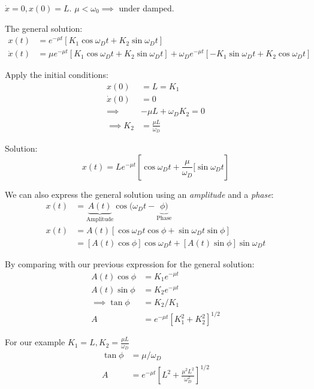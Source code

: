 \documentclass[twoside]{scrartcl}
\begin{document}
\begin{example}

$\dot{x} = 0, x(0) = L$. $\mu < \omega_0 \implies$ under damped.

The general solution:
\[
\begin{aligned}
  x(t) &= e^{-\mu t}[K_1\cos\omega_Dt + K_2\sin\omega_Dt]\\
  \dot{x}(t) &= \mu e^{-\mu t}[K_1\cos\omega_Dt + K_2\sin\omega_Dt] + \omega_De^{-\mu t}[-K_1\sin\omega_Dt + K_2\cos\omega_Dt]
\end{aligned}
\]

Apply the initial conditions:
\[
\begin{aligned}
  x(0) &= L = K_1\\
  \dot{x}(0) &= 0\\
  \implies &-\mu L  + \omega_DK_2 = 0\\
 \implies K_2 &= \frac{\mu L}{\omega_D}
\end{aligned}
\]

Solution: 
\[x(t) = Le^{-\mu t}\left[\cos\omega_Dt + \frac{\mu}{\omega_D}[\sin\omega_Dt\right]\]	
\end{example}

We can also express the general solution using an \emph{amplitude} and a \emph{phase}:
\[
\begin{aligned}
  x(t) &= \underbrace{A(t)}_{\text{Amplitude}}\cos(\omega_Dt - \underbrace{\phi)}_{\text{Phase}}\\
  x(t) &= A(t)[\cos\omega_Dt\cos\phi + \sin\omega_Dt\sin\phi]\\
  &= [A(t)\cos\phi]\cos\omega_Dt + [A(t)\sin\phi]\sin\omega_Dt
\end{aligned}
\]

By comparing with our previous expression for the general solution:
\[
\begin{aligned}
  A(t)\cos\phi &= K_1e^{-\mu t}\\
  A(t)\sin\phi &= K_2e^{-\mu t}\\
  \implies \tan\phi &= K_2/K_1\\
  A &= e^{-\mu t}[K_1^2 + K_2^2]^{1/2}
\end{aligned}
\]

For our example $K_1 = L, K_2 = \frac{\mu L}{\omega_D}$
\[
\begin{aligned}
  \tan\phi &= \mu/\omega_D\\
  A &= e^{-\mu t}\left[L^2 + \frac{\mu^2L^2}{\omega_D^2}\right]^{1/2}
\end{aligned}
\]
\end{document}

